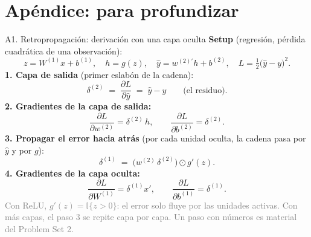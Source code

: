 \documentclass{beamer}
\newcommand{\1}{\mathbb{I}}
\begin{document}
\appendix
\section{Apéndice: para profundizar}
\begin{frame}[noframenumbering]
\tableofcontents[currentsection]
\end{frame}

\begin{frame}{A1. Retropropagación: derivación con una capa oculta}
\small
\textbf{Setup} (regresión, pérdida cuadrática de una observación):
\[ z = W^{(1)} x + b^{(1)}, \quad h = g(z), \quad \hat{y} = w^{(2)\prime} h + b^{(2)}, \quad L = \tfrac{1}{2}\big(\hat{y} - y\big)^2. \]
\pause
\textbf{1. Capa de salida} (primer eslabón de la cadena):
\[ \delta^{(2)} \;=\; \frac{\partial L}{\partial \hat{y}} \;=\; \hat{y} - y \qquad \text{(el residuo)}. \]
\pause
\textbf{2. Gradientes de la capa de salida:}
\[ \frac{\partial L}{\partial w^{(2)}} = \delta^{(2)}\, h, \qquad \frac{\partial L}{\partial b^{(2)}} = \delta^{(2)}. \]
\pause
\textbf{3. Propagar el error hacia atrás} (por cada unidad oculta, la cadena pasa por $\hat{y}$ y por $g$):
\[ \delta^{(1)} \;=\; \big( w^{(2)} \, \delta^{(2)} \big) \odot g'(z). \]
\pause
\textbf{4. Gradientes de la capa oculta:}
\[ \frac{\partial L}{\partial W^{(1)}} = \delta^{(1)} x', \qquad \frac{\partial L}{\partial b^{(1)}} = \delta^{(1)}. \]
\pause
\textcolor{gray}{Con ReLU, $g'(z) = \1\{z > 0\}$: el error solo fluye por las unidades activas. Con más capas, el paso 3 se repite capa por capa. Un paso con números es material del Problem Set 2.}
\end{frame}
\end{document}
